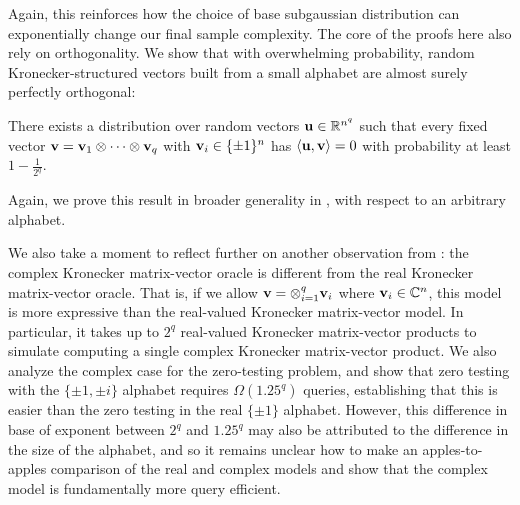 Again, this reinforces how the choice of base subgaussian distribution can exponentially change our final sample complexity.
The core of the proofs here also rely on orthogonality.
We show that with overwhelming probability, random Kronecker-structured vectors built from a small alphabet are almost surely perfectly orthogonal:
\begin{lemma}
	There exists a distribution over random vectors \(\boldsymbol{\mathrm{u}}\in{\mathbb R}^{n^q}\) such that every fixed vector \(\boldsymbol{\mathrm{v}} = \boldsymbol{\mathrm{v}}_1 \otimes \cdots \otimes \boldsymbol{\mathrm{v}}_q\) with \(\boldsymbol{\mathrm{v}}_i \in \{\pm1\}^n\) has \(\langle \boldsymbol{\mathrm{u}}, \boldsymbol{\mathrm{v}} \rangle=0\) with probability at least \(1-\frac1{2^q}\).
\end{lemma}
Again, we prove this result in broader generality in , with respect to an arbitrary alphabet.

We also take a moment to reflect further on another observation from \cite{meyer2023hutchinson}: the complex Kronecker matrix-vector oracle is different from the real Kronecker matrix-vector oracle.
That is, if we allow \(\boldsymbol{\mathrm{v}} = \otimes_{i=1}^q \boldsymbol{\mathrm{v}}_i\) where \(\boldsymbol{\mathrm{v}}_i \in {\mathbb C}^n\), this model is more expressive than the real-valued Kronecker matrix-vector model.
In particular, it takes up to \(2^q\) real-valued Kronecker matrix-vector products to simulate computing a single complex Kronecker matrix-vector product.
We also analyze the complex case for the zero-testing problem, and show that zero testing with the \(\{\pm1,\pm i\}\) alphabet requires \(\Omega(1.25^q)\) queries, establishing that this is easier than the zero testing in the real \(\{\pm1\}\) alphabet.
However, this difference in base of exponent between \(2^q\) and \(1.25^q\) may also be attributed to the difference in the size of the alphabet, and so it remains unclear how to make an apples-to-apples comparison of the real and complex models and show that the complex model is fundamentally more query efficient.
